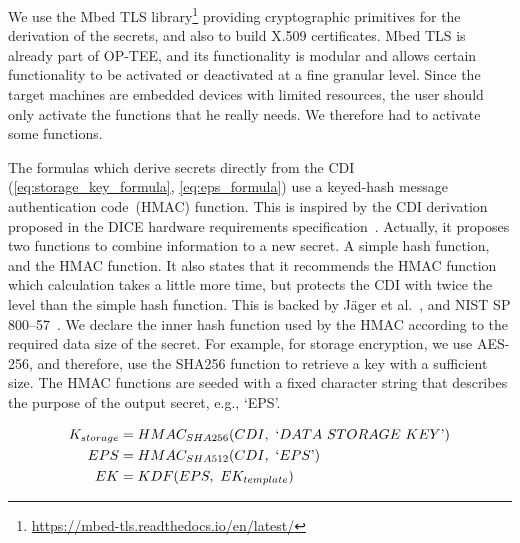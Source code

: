 We use the Mbed TLS library\footnote{\url{https://mbed-tls.readthedocs.io/en/latest/}} providing cryptographic primitives for the derivation of the secrets, and also to build X.509 certificates.
Mbed TLS is already part of OP-TEE, and its functionality is modular and allows certain functionality to be activated or deactivated at a fine granular level.
Since the target machines are embedded devices with limited resources, the user should only activate the functions that he really needs.
We therefore had to activate some functions.

The formulas which derive secrets directly from the CDI (\autoref{eq:storage_key_formula}, \autoref{eq:eps_formula}) use a keyed-hash message authentication code~(HMAC) function.
This is inspired by the CDI derivation proposed in the DICE hardware requirements specification~\cite{dice-hardware-reqs}.
Actually, it proposes two functions to combine information to a new secret.
A simple hash function, and the HMAC function.
It also states that it recommends the HMAC function which calculation takes a little more time, but protects the CDI with twice the level than the simple hash function.
This is backed by Jäger et al.~\cite{Jaeger2017}, and NIST SP 800--57~\cite{Barker2020}.
We declare the inner hash function used by the HMAC according to the required data size of the secret.
For example, for storage encryption, we use AES-256, and therefore, use the SHA256 function to retrieve a key with a sufficient size.
The HMAC functions are seeded with a fixed character string that describes the purpose of the output secret, e.g., `EPS'.

\begin{align}
  \label{eq:storage_key_formula}
  K_{storage} &= HMAC_{SHA256}(CDI,\ `DATA\ STORAGE\ KEY\text{'})\\
  \label{eq:eps_formula}
  EPS &= HMAC_{SHA512}(CDI,\ `EPS\text{'})\\
  \label{eq:ek_formula}
  EK  &= KDF(EPS,\ EK_{template})
\end{align}



